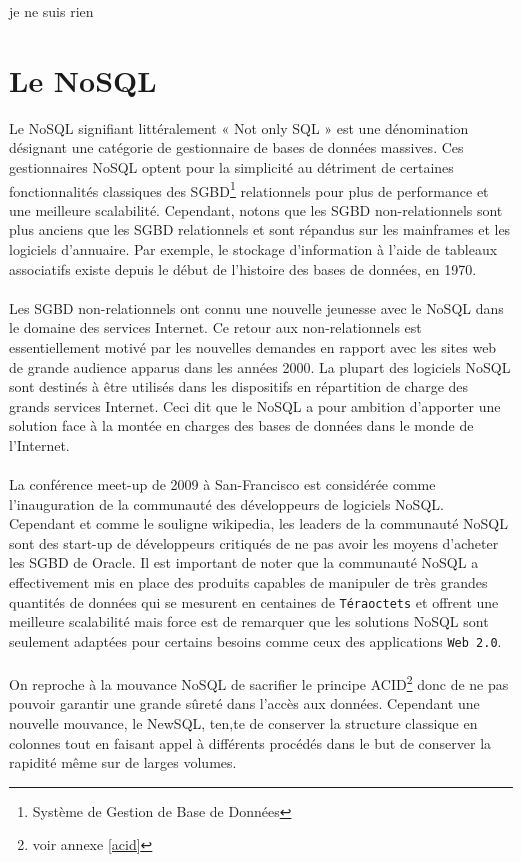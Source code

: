 je ne suis rien

\section{Le \textsf{NoSQL}}

Le NoSQL signifiant littéralement « \textsf{Not only SQL} » est une
dénomination désignant une catégorie de gestionnaire de bases de
données massives. Ces gestionnaires \textsf{NoSQL} optent pour la
simplicité au détriment de certaines fonctionnalités classiques des
\textsf{SGBD}\footnote{Système de Gestion de Base de Données}
relationnels pour plus de performance et une meilleure
scalabilité. Cependant, notons que les \textsf{SGBD} non-relationnels
sont plus anciens que les \textsf{SGBD} relationnels et sont répandus
sur les mainframes et les logiciels d'annuaire. Par exemple, le
stockage d'information à l'aide de tableaux associatifs existe depuis
le début de l'histoire des bases de données, en 1970.  \\ \\ Les
\textsf{SGBD} non-relationnels ont connu une nouvelle jeunesse avec le
\textsf{NoSQL} dans le domaine des services \textsf{Internet}. Ce
retour aux non-relationnels est essentiellement motivé par les
nouvelles demandes en rapport avec les sites web de grande audience
apparus dans les années 2000. La plupart des logiciels \textsf{NoSQL}
sont destinés à être utilisés dans les dispositifs en répartition de
charge des grands services \textsf{Internet}. Ceci dit que le
\textsf{NoSQL} a pour ambition d'apporter une solution face à la
montée en charges des bases de données dans le monde de
l'\textsf{Internet}.  \\ \\ La conférence meet-up de 2009 à
\textsf{San-Francisco} est considérée comme l'inauguration de la
communauté des développeurs de logiciels \textsf{NoSQL}. Cependant et
comme le souligne \textsf{wikipedia}, les leaders de la communauté
NoSQL sont des \textsf{start-up} de développeurs critiqués de ne pas
avoir les moyens d'acheter les SGBD de Oracle\cite{wikiNoSQL}. Il est
important de noter que la communauté \textsf{NoSQL} a effectivement
mis en place des produits capables de manipuler de très grandes
quantités de données qui se mesurent en centaines de
\texttt{Téraoctets} et offrent une meilleure scalabilité mais force
est de remarquer que les solutions \textsf{NoSQL} sont seulement
adaptées pour certains besoins comme ceux des applications \texttt{Web
  2.0}.  \\\\ On reproche à la mouvance \textsf{NoSQL} de sacrifier le
principe \textsf{ACID}\footnote{voir annexe \ref{acid}} donc de ne
pas pouvoir garantir une grande sûreté dans l'accès aux
données. Cependant une nouvelle mouvance, le \textsf{NewSQL}, ten,te
de conserver la structure classique en colonnes tout en faisant appel
à différents procédés dans le but de conserver la rapidité même sur de
larges volumes\cite{newSQL}.


